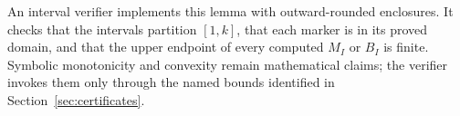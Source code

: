An interval verifier implements this lemma with outward-rounded enclosures.
It checks that the intervals partition $[1,k]$, that each marker is in its
proved domain, and that the upper endpoint of every computed $M_I$ or $B_I$
is finite.  Symbolic monotonicity and convexity remain mathematical claims;
the verifier invokes them only through the named bounds identified in
Section~\ref{sec:certificates}.
